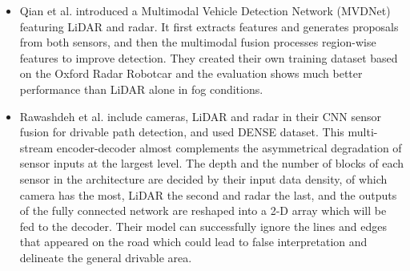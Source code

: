 \documentclass[rnd]{mas_proposal}
\begin{document}
\begin{itemize}
    \item Qian et al. \cite{qian2021robust} introduced a Multimodal Vehicle Detection Network (MVDNet) featuring LiDAR and radar. It first extracts features and generates proposals from both sensors, and then the multimodal fusion processes region-wise features to improve detection. They created their own training dataset based on the Oxford Radar Robotcar \cite{barnes2020oxford} and the evaluation shows much better performance than LiDAR alone in fog conditions.

    \item Rawashdeh et al. \cite{rawashdeh2021drivable} include cameras, LiDAR and radar in their CNN sensor fusion for drivable path detection, and used DENSE \cite{bijelic2020seeing} dataset. This multi-stream encoder-decoder almost complements the asymmetrical degradation of sensor inputs at the largest level. The depth and the number of blocks of each sensor in the architecture are decided by their input data density, of which camera has the most, LiDAR the second and radar the last, and the outputs of the fully connected network are reshaped into a 2-D array which will be fed to the decoder. Their model can successfully ignore the lines and edges that appeared on the road which could lead to false interpretation and delineate the general drivable area. 


\end{itemize}
\end{document}
